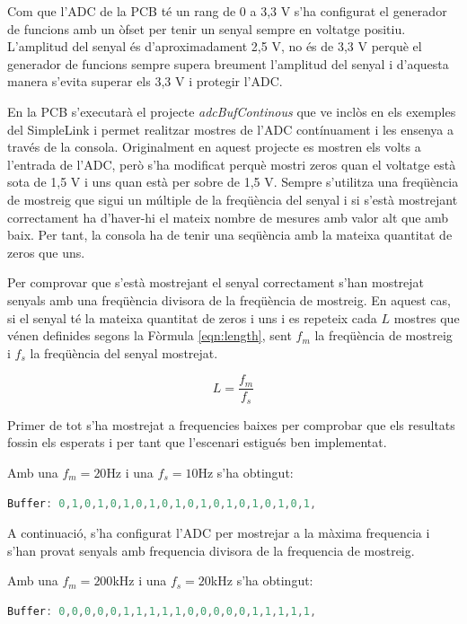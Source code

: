 Com que l'ADC de la PCB té un rang de 0 a 3,3 V s'ha configurat el generador de funcions amb un òfset per tenir un senyal sempre en voltatge positiu.
L'amplitud del senyal és d'aproximadament 2,5 V, no és de 3,3 V perquè el generador de funcions sempre supera breument l'amplitud del senyal i d'aquesta manera s'evita superar els 3,3 V i protegir l'ADC.

En la PCB s'executarà el projecte \textit{adcBufContinous} que ve inclòs en els exemples del SimpleLink i permet realitzar mostres de l'ADC contínuament i les ensenya a través de la consola.
Originalment en aquest projecte es mostren els volts a l'entrada de l'ADC, però s'ha modificat perquè mostri zeros quan el voltatge està sota de 1,5 V i uns quan està per sobre de 1,5 V.
Sempre s'utilitza una freqüència de mostreig que sigui un múltiple de la freqüència del senyal i si s'està mostrejant correctament ha d'haver-hi el mateix nombre de mesures amb valor alt que amb baix.
Per tant, la consola ha de tenir una seqüència amb la mateixa quantitat de zeros que uns.

Per comprovar que s'està mostrejant el senyal correctament s'han mostrejat senyals amb una freqüència divisora de la freqüència de mostreig.
En aquest cas, si el senyal té la mateixa quantitat de zeros i uns i es repeteix cada $L$ mostres que vénen definides segons la Fòrmula \ref{eqn:length}, sent $f_{m}$ la freqüència de mostreig i $f_{s}$ la freqüència del senyal mostrejat.


\begin{equation}
	\label{eqn:length}
	L=\frac{f_{m}}{f_{s}}
\end{equation}

Primer de tot s'ha mostrejat a frequencies baixes per comprobar que els resultats fossin els esperats i per tant que l'escenari estigués ben implementat.

Amb una $f_{m}=20$Hz i una $f_{s}=10$Hz s'ha obtingut:
\begin{lstlisting}[language=C]
	Buffer: 0,1,0,1,0,1,0,1,0,1,0,1,0,1,0,1,0,1,0,1,
\end{lstlisting}

A continuació, s'ha configurat l'ADC per mostrejar a la màxima frequencia i s'han provat senyals amb frequencia divisora de la frequencia de mostreig.

Amb una $f_{m}=200$kHz i una $f_{s}=20$kHz s'ha obtingut:
\begin{lstlisting}[language=C]
	Buffer: 0,0,0,0,0,1,1,1,1,1,0,0,0,0,0,1,1,1,1,1,
\end{lstlisting}

